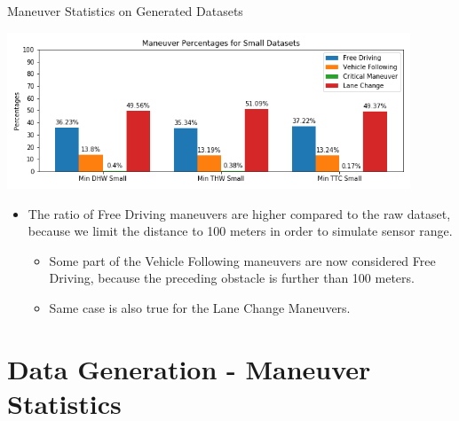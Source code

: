 \documentclass[shortpres]{beamer}
\begin{document}
\begin{frame}{Maneuver Statistics on Generated Datasets}	

\begin{center}
	\includegraphics[width=12cm]{small_datasets_maneuvers}
\end{center}

\begin{itemize} 
\fontsize{8pt}{10pt}\selectfont\item The ratio of Free Driving maneuvers are higher compared to the raw dataset, because we limit the distance to 100 meters in order to simulate sensor range.
	\begin{itemize} 
		\fontsize{8pt}{10pt}\selectfont\item Some part of the Vehicle Following maneuvers are now considered Free Driving, because the preceding obstacle is further than 100 meters.
		\fontsize{8pt}{10pt}\selectfont\item Same case is also true for the Lane Change Maneuvers.
	\end{itemize}
\end{itemize}

\end{frame}

\section{Data Generation - Maneuver Statistics}	
\end{document}
